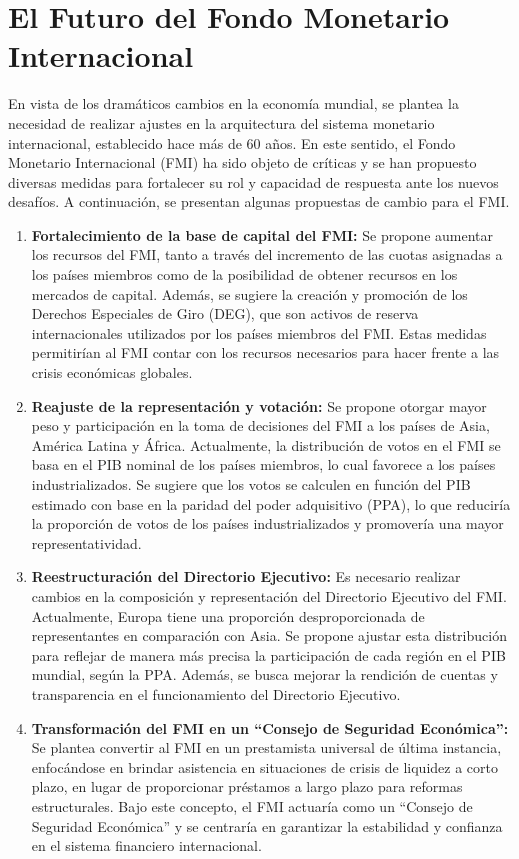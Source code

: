 \documentclass[
  jou,
  floatsintext,
  longtable,
  a4paper,
  nolmodern,
  notxfonts,
  notimes,
  12pt,
  colorlinks=true,linkcolor=blue,citecolor=blue,urlcolor=blue]{apa7}
\begin{document}
\section{El Futuro del Fondo Monetario
Internacional}\label{el-futuro-del-fondo-monetario-internacional}

En vista de los dramáticos cambios en la economía mundial, se plantea la
necesidad de realizar ajustes en la arquitectura del sistema monetario
internacional, establecido hace más de 60 años. En este sentido, el
Fondo Monetario Internacional (FMI) ha sido objeto de críticas y se han
propuesto diversas medidas para fortalecer su rol y capacidad de
respuesta ante los nuevos desafíos. A continuación, se presentan algunas
propuestas de cambio para el FMI.

\begin{enumerate}
\def\labelenumi{\arabic{enumi}.}
\item
  \textbf{Fortalecimiento de la base de capital del FMI:} Se propone
  aumentar los recursos del FMI, tanto a través del incremento de las
  cuotas asignadas a los países miembros como de la posibilidad de
  obtener recursos en los mercados de capital. Además, se sugiere la
  creación y promoción de los Derechos Especiales de Giro (DEG), que son
  activos de reserva internacionales utilizados por los países miembros
  del FMI. Estas medidas permitirían al FMI contar con los recursos
  necesarios para hacer frente a las crisis económicas globales.
\item
  \textbf{Reajuste de la representación y votación:} Se propone otorgar
  mayor peso y participación en la toma de decisiones del FMI a los
  países de Asia, América Latina y África. Actualmente, la distribución
  de votos en el FMI se basa en el PIB nominal de los países miembros,
  lo cual favorece a los países industrializados. Se sugiere que los
  votos se calculen en función del PIB estimado con base en la paridad
  del poder adquisitivo (PPA), lo que reduciría la proporción de votos
  de los países industrializados y promovería una mayor
  representatividad.
\item
  \textbf{Reestructuración del Directorio Ejecutivo:} Es necesario
  realizar cambios en la composición y representación del Directorio
  Ejecutivo del FMI. Actualmente, Europa tiene una proporción
  desproporcionada de representantes en comparación con Asia. Se propone
  ajustar esta distribución para reflejar de manera más precisa la
  participación de cada región en el PIB mundial, según la PPA. Además,
  se busca mejorar la rendición de cuentas y transparencia en el
  funcionamiento del Directorio Ejecutivo.
\item
  \textbf{Transformación del FMI en un ``Consejo de Seguridad
  Económica'':} Se plantea convertir al FMI en un prestamista universal
  de última instancia, enfocándose en brindar asistencia en situaciones
  de crisis de liquidez a corto plazo, en lugar de proporcionar
  préstamos a largo plazo para reformas estructurales. Bajo este
  concepto, el FMI actuaría como un ``Consejo de Seguridad Económica'' y
  se centraría en garantizar la estabilidad y confianza en el sistema
  financiero internacional.
\end{enumerate}
\end{document}
